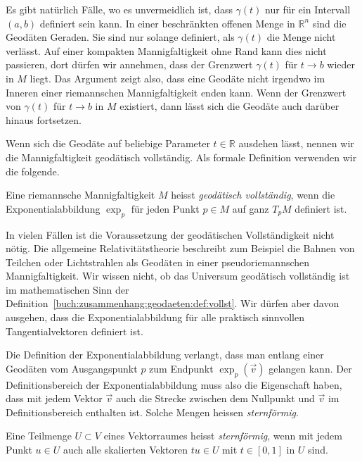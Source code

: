 Es gibt natürlich Fälle, wo es unvermeidlich ist, dass $\gamma(t)$
nur für ein Intervall $(a,b)$ definiert sein kann.
In einer beschränkten offenen Menge in $\mathbb{R}^n$ sind die Geodäten
Geraden.
Sie sind nur solange definiert, als $\gamma(t)$ die Menge
nicht verlässt.
Auf einer kompakten Mannigfaltigkeit ohne Rand kann dies nicht passieren,
dort dürfen wir annehmen, dass der Grenzwert $\gamma(t)$ für $t\to b$
wieder in $M$ liegt.
Das Argument zeigt also, dass eine Geodäte nicht irgendwo im Inneren
einer riemannschen Mannigfaltigkeit enden kann.
Wenn der Grenzwert von $\gamma(t)$ für $t\to b$ in $M$ existiert, dann
lässt sich die Geodäte auch darüber hinaus fortsetzen.

Wenn sich die Geodäte auf beliebige Parameter $t\in\mathbb{R}$
ausdehen lässt, nennen wir die Mannigfaltigkeit geodätisch vollständig.
Als formale Definition verwenden wir die folgende.

\begin{definition}
\label{buch:zusammenhang:geodaeten:def:vollst}
Eine riemannsche Mannigfaltigkeit $M$ heisst \emph{geodätisch vollständig},
wenn die Exponentialabbildung $\exp_p$ für jeden Punkt $p\in M$
auf ganz $T_pM$ definiert ist.
%
\end{definition}

In vielen Fällen ist die Voraussetzung der geodätischen Vollständigkeit
nicht nötig.
Die allgemeine Relativitätstheorie beschreibt zum Beispiel die Bahnen
von Teilchen oder Lichtstrahlen als Geodäten in einer pseudoriemannschen
Mannigfaltigkeit.
%
Wir wissen nicht, ob das Universum geodätisch vollständig ist im
mathematischen Sinn der
Definition~\ref{buch:zusammenhang:geodaeten:def:vollst}.
Wir dürfen aber davon ausgehen, dass die Exponentialabbildung für alle
praktisch sinnvollen Tangentialvektoren definiert ist.

Die Definition der Exponentialabbildung verlangt, dass man entlang einer
Geodäten vom Ausgangspunkt $p$ zum Endpunkt $\exp_p(\vec{v})$ gelangen
kann.
Der Definitionsbereich der Exponentialabbildung muss also die Eigenschaft
haben, dass mit jedem Vektor $\vec{v}$ auch die Strecke zwischen dem Nullpunkt
und $\vec{v}$ im Definitionsbereich enthalten ist.
Solche Mengen heissen \emph{sternförmig}.

\begin{definition}[sternförmig]
\label{buch:zusammenhang:geodaeten:def:sternfoermig}
Eine Teilmenge $U\subset V$ eines Vektorraumes heisst \emph{sternförmig},
wenn mit jedem Punkt $u\in U$ auch alle skalierten Vektoren $tu\in U$
mit $t\in [0,1]$ in $U$ sind.
%
\end{definition}


